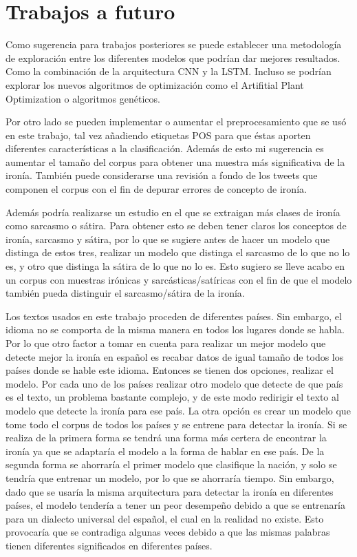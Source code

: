 		\section{Trabajos a futuro}
		
		\par Como sugerencia para trabajos posteriores se puede establecer una metodología de exploración entre los diferentes modelos que podrían dar mejores resultados. Como la combinación de la arquitectura CNN y la LSTM. Incluso se podrían explorar los nuevos algoritmos de optimización como el Artifitial Plant Optimization o algoritmos genéticos. 
		
		\par Por otro lado se pueden implementar o aumentar el preprocesamiento que se usó en este trabajo, tal vez añadiendo etiquetas POS para que éstas aporten diferentes características a la clasificación. Además de esto mi sugerencia es aumentar el tamaño del corpus para obtener una muestra más significativa de la ironía. También puede considerarse una revisión a fondo de los tweets que componen el corpus con el fin de depurar errores de concepto de ironía. 
		
		\par Además podría realizarse un estudio en el que se extraigan más clases de ironía como sarcasmo o sátira. Para obtener esto se deben tener claros los conceptos de ironía, sarcasmo y sátira, por lo que se sugiere antes de hacer un modelo que distinga de estos tres, realizar un modelo que distinga el sarcasmo de lo que no lo es, y otro que distinga la sátira de lo que no lo es. Esto sugiero se lleve acabo en un corpus con muestras irónicas y sarcásticas/satíricas con el fin de que el modelo también pueda distinguir el sarcasmo/sátira de la ironía.
		
		\par Los textos usados en este trabajo proceden de diferentes países. Sin embargo, el idioma no se comporta de la misma manera en todos los lugares donde se habla. Por lo que otro factor a tomar en cuenta para realizar un mejor modelo que detecte mejor la ironía en español es recabar datos de igual tamaño de todos los países donde se hable este idioma. Entonces se tienen dos opciones, realizar el modelo. Por cada uno de los países realizar otro modelo que detecte de que país es el texto, un problema bastante complejo, y de este modo redirigir el texto al modelo que detecte la ironía para ese país. La otra opción es crear un modelo que tome todo el corpus de todos los países y se entrene para detectar la ironía. Si se realiza de la primera forma se tendrá una forma más certera de encontrar la ironía ya que se adaptaría el modelo a la forma de hablar en ese país. De la segunda forma se ahorraría el primer modelo que clasifique la nación, y solo se tendría que entrenar un modelo, por lo que se ahorraría tiempo. Sin embargo, dado que se usaría la misma arquitectura para detectar la ironía en diferentes países, el modelo tendería a tener un peor desempeño debido a que se entrenaría para un dialecto universal del español, el cual en la realidad no existe. Esto provocaría que se contradiga algunas veces debido a que las mismas palabras tienen diferentes significados en diferentes países. 
